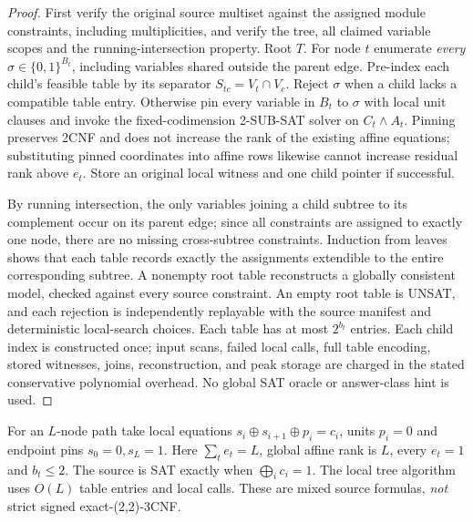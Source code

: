 \documentclass[11pt]{article}
\begin{document}
\begin{proof}
First verify the original source multiset against the assigned
module constraints, including multiplicities, and verify the tree,
all claimed variable scopes and the running-intersection property.
Root $T$. For node $t$ enumerate \emph{every}
$\sigma\in\{0,1\}^{B_t}$, including variables shared outside the
parent edge. Pre-index each child's feasible table by its
separator $S_{tc}=V_t\cap V_c$.
Reject $\sigma$ when a child lacks a compatible table entry.
Otherwise pin every variable in $B_t$ to $\sigma$ with local
unit clauses and invoke the fixed-codimension 2-SUB-SAT solver
on $C_t\land A_t$. Pinning preserves 2CNF and does not
increase the rank of the existing affine equations;
substituting pinned coordinates into affine rows likewise
cannot increase residual rank above $e_t$.
Store an original local witness and one child pointer if successful.

By running intersection, the only variables joining a child
subtree to its complement occur on its parent edge; since
all constraints are assigned to exactly one node, there
are no missing cross-subtree constraints.
Induction from leaves shows that each table records exactly
the assignments extendible to the entire corresponding subtree.
A nonempty root table reconstructs a globally consistent
model, checked against every source constraint.
An empty root table is UNSAT, and each rejection is
independently replayable with the source manifest and
deterministic local-search choices.
Each table has at most $2^{b_t}$ entries.
Each child index is constructed once; input scans, failed
local calls, full table encoding, stored witnesses, joins,
reconstruction, and peak storage are charged in the stated
conservative polynomial overhead.
No global SAT oracle or answer-class hint is used.
\end{proof}
\begin{corollary}
For an $L$-node path take local equations
$s_i\oplus s_{i+1}\oplus p_i=c_i$,
units $p_i=0$ and endpoint pins $s_0=0,s_L=1$.
Here $\sum_t e_t=L$, global affine rank is $L$,
every $e_t=1$ and $b_t\le2$.
The source is SAT exactly when $\bigoplus_i c_i=1$.
The local tree algorithm uses $O(L)$ table entries and local calls.
These are mixed source formulas, \emph{not} strict signed exact-(2,2)-3CNF.
\end{corollary}
\end{document}
